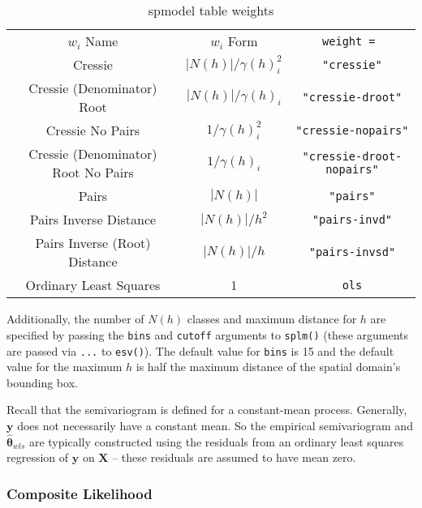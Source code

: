 \documentclass{article}
\begin{document}
\begin{table}\label{tab:weights}
  \centering
  \begin{tabular}{c|c|c}
  \hline
  $w_i$ Name & $w_i$ Form & \texttt{weight = } \\
  Cressie & $|N(h)| / \gamma(h)_i^2$ & \texttt{"cressie"} \\
  Cressie (Denominator) Root & $|N(h)| / \gamma(h)_i$ & \texttt{"cressie-droot"} \\
  Cressie No Pairs & $1 / \gamma(h)_i^2$ & \texttt{"cressie-nopairs"} \\
  Cressie (Denominator) Root No Pairs & $1 / \gamma(h)_i$ & \texttt{"cressie-droot-nopairs"} \\
  Pairs & $|N(h)|$ & \texttt{"pairs"} \\
  Pairs Inverse Distance & $|N(h)| / h^2$ & \texttt{"pairs-invd"} \\
  Pairs Inverse (Root) Distance & $|N(h)| / h$ & \texttt{"pairs-invsd"} \\
  Ordinary Least Squares & 1 & \texttt{ols}
  \end{tabular}
  \caption{spmodel table weights}
\end{table}

Additionally, the number of \(N(h)\) classes and maximum distance for
\(h\) are specified by passing the \texttt{bins} and \texttt{cutoff}
arguments to \texttt{splm()} (these arguments are passed via
\texttt{...} to \texttt{esv()}). The default value for \texttt{bins} is
15 and the default value for the maximum \(h\) is half the maximum
distance of the spatial domain's bounding box.

Recall that the semivariogram is defined for a constant-mean process.
Generally, \(\mathbf{y}\) does not necessarily have a constant mean. So
the empirical semivariogram and \(\bm{\hat{\theta}}_{wls}\) are
typically constructed using the residuals from an ordinary least squares
regression of \(\mathbf{y}\) on \(\mathbf{X}\) -- these residuals are
assumed to have mean zero.

\hypertarget{composite-likelihood}{%
\subsubsection{Composite Likelihood}\label{composite-likelihood}}
\end{document}
